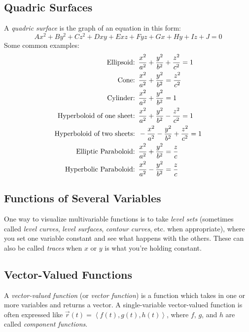\documentclass[12pt]{article}
\theoremstyle{definition}
\begin{document}
\subsection{Quadric Surfaces}
A \textit{quadric surface} is the graph of an equation in this form: \begin{equation*}
	Ax^2 + By^2 + Cz^2 + Dxy + Exz + Fyz + Gx + Hy + Iz + J = 0
\end{equation*}
Some common examples: \begin{align*}
	\text{Ellipsoid:\hspace{0.5em}}                 & \frac{x^2}{a^2} + \frac{y^2}{b^2} + \frac{z^2}{c^2} = 1  \\
	\text{Cone:\hspace{0.5em}}                      & \frac{x^2}{a^2} + \frac{y^2}{b^2} = \frac{z^2}{c^2}      \\
	\text{Cylinder:\hspace{0.5em}}                  & \frac{x^2}{a^2} + \frac{y^2}{b^2} = 1                    \\
	\text{Hyperboloid of one sheet:\hspace{0.5em}}  & \frac{x^2}{a^2} + \frac{y^2}{b^2} - \frac{z^2}{c^2} = 1  \\
	\text{Hyperboloid of two sheets:\hspace{0.5em}} & -\frac{x^2}{a^2} - \frac{y^2}{b^2} + \frac{z^2}{c^2} = 1 \\
	\text{Elliptic Paraboloid:\hspace{0.5em}}       & \frac{x^2}{a^2} + \frac{y^2}{b^2} = \frac{z}{c}          \\
	\text{Hyperbolic Paraboloid:\hspace{0.5em}}     & \frac{x^2}{a^2} - \frac{y^2}{b^2} = \frac{z}{c}          \\
\end{align*}

\subsection{Functions of Several Variables}
One way to visualize multivariable functions is to take \textit{level sets} (sometimes called \textit{level curves}, \textit{level surfaces}, \textit{contour curves}, etc. when appropriate), where you set one variable constant and see what happens with the others.
These can also be called \textit{traces} when $x$ or $y$ is what you're holding constant.

\subsection{Vector-Valued Functions}
A \textit{vector-valued function} (or \textit{vector function}) is a function which takes in one or more variables and returns a vector.
A single-variable vector-valued function is often expressed like $\vec{r}(t) = \left\langle f(t), g(t), h(t) \right\rangle$, where $f$, $g$, and $h$ are called \textit{component functions}.
\end{document}
